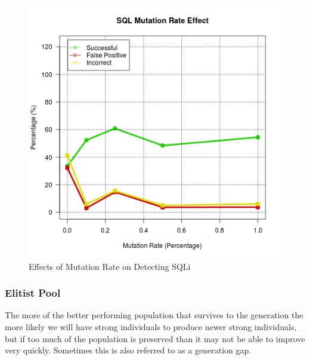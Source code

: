 \begin{figure}
	\label{fig:resMutation}
	\includegraphics[width=450px]{./assets/results/ga/mutation/Results_SQL.png}
	\caption{Effects of Mutation Rate on Detecting SQLi}
\end{figure}

\subsubsection{Elitist Pool}

The more of the better performing population that survives to the generation the more likely we will have strong individuals to produce newer strong individuals, but if too much of the population is preserved than it may not be able to improve very quickly.  Sometimes this is also referred to as a generation gap. %

